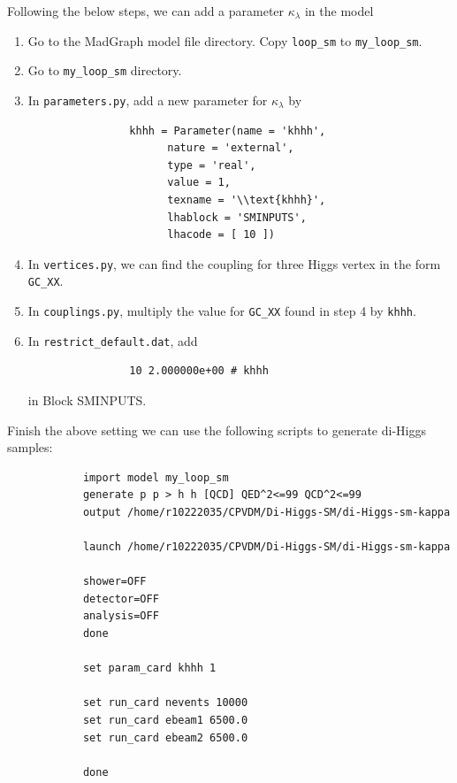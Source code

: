 \documentclass[12pt]{article}
\begin{document}
		Following the below steps, we can add a parameter $\kappa_\lambda$ in the model
		\begin{enumerate}
			\item Go to the MadGraph model file directory. Copy \verb+loop_sm+ to \verb+my_loop_sm+.
			\item Go to \verb+my_loop_sm+ directory. 
			\item In \verb+parameters.py+, add a new parameter for $\kappa_\lambda$ by
				\begin{verbatim}
				khhh = Parameter(name = 'khhh',
					  nature = 'external',
					  type = 'real',
					  value = 1,
					  texname = '\\text{khhh}',
					  lhablock = 'SMINPUTS',
					  lhacode = [ 10 ])
				\end{verbatim}
			\item In \verb+vertices.py+, we can find the coupling for three Higgs vertex in the form \verb+GC_XX+. 
			\item In \verb+couplings.py+, multiply the value for \verb+GC_XX+ found in step 4 by \verb+khhh+.
			\item In \verb+restrict_default.dat+, add
				\begin{verbatim}
				10 2.000000e+00 # khhh 
				\end{verbatim}
				in Block SMINPUTS.
		\end{enumerate}

		Finish the above setting we can use the following scripts to generate di-Higgs samples:
			\begin{verbatim}
			import model my_loop_sm
			generate p p > h h [QCD] QED^2<=99 QCD^2<=99
			output /home/r10222035/CPVDM/Di-Higgs-SM/di-Higgs-sm-kappa

			launch /home/r10222035/CPVDM/Di-Higgs-SM/di-Higgs-sm-kappa

			shower=OFF
			detector=OFF
			analysis=OFF
			done

			set param_card khhh 1

			set run_card nevents 10000
			set run_card ebeam1 6500.0
			set run_card ebeam2 6500.0

			done
			\end{verbatim}

\end{document}
